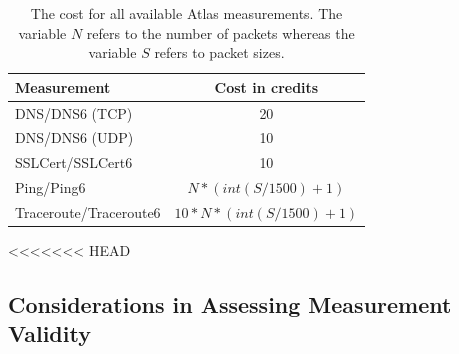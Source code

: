 %
%
%

% 

\begin{table}[t]
\centering
\begin{tabular}{lc}
\textbf{Measurement} & \textbf{Cost in credits} \\
\hline 
DNS\slash DNS6 (TCP) & 20\\ 
DNS\slash DNS6 (UDP) & 10\\ 
SSLCert\slash SSLCert6 & 10 \\
Ping\slash Ping6 & $N * (int(S/1500)+1)$\\
Traceroute\slash Traceroute6 & $ 10*N*(int(S/1500)+1)$\\[1ex] 
\hline 
\end{tabular} 
\caption{The cost for all available Atlas measurements.  The variable $N$
refers to the number of packets whereas the variable $S$ refers to packet
sizes.}
\label{tab:cost} 
\end{table}

<<<<<<< HEAD
\subsection{Considerations in Assessing Measurement Validity}

